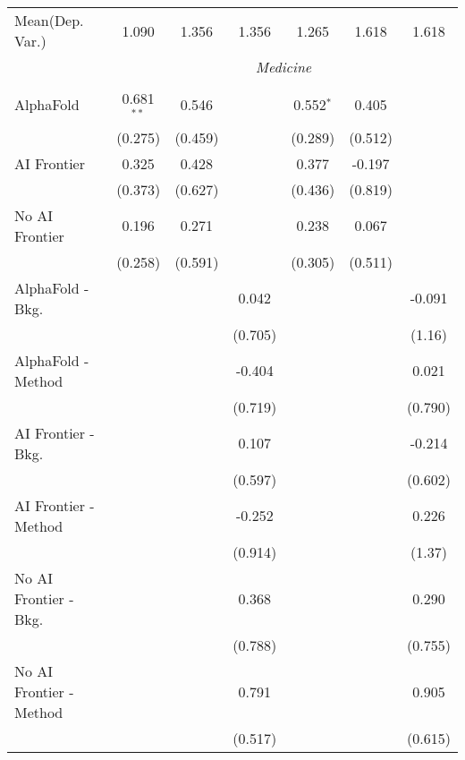 \begin{tabular}{lcccccc}
Mean(Dep. Var.) & 1.090 & 1.356 & 1.356 & 1.265 & 1.618 & 1.618 \\
 & \multicolumn{6}{c}{\textit{Medicine}} \\ \\
   AlphaFold               & 0.681$^{**}$ & 0.546   &         & 0.552$^{*}$ & 0.405   &   \\   
                           & (0.275)      & (0.459) &         & (0.289)     & (0.512) &   \\   
   AI Frontier             & 0.325        & 0.428   &         & 0.377       & -0.197  &   \\   
                           & (0.373)      & (0.627) &         & (0.436)     & (0.819) &   \\   
   No AI Frontier          & 0.196        & 0.271   &         & 0.238       & 0.067   &   \\   
                           & (0.258)      & (0.591) &         & (0.305)     & (0.511) &   \\   
   AlphaFold - Bkg.        &              &         & 0.042   &             &         & -0.091\\   
                           &              &         & (0.705) &             &         & (1.16)\\   
   AlphaFold - Method      &              &         & -0.404  &             &         & 0.021\\   
                           &              &         & (0.719) &             &         & (0.790)\\   
   AI Frontier - Bkg.      &              &         & 0.107   &             &         & -0.214\\   
                           &              &         & (0.597) &             &         & (0.602)\\   
   AI Frontier - Method    &              &         & -0.252  &             &         & 0.226\\   
                           &              &         & (0.914) &             &         & (1.37)\\   
   No AI Frontier - Bkg.   &              &         & 0.368   &             &         & 0.290\\   
                           &              &         & (0.788) &             &         & (0.755)\\   
   No AI Frontier - Method &              &         & 0.791   &             &         & 0.905\\   
                           &              &         & (0.517) &             &         & (0.615)\\   

\end{tabular}
